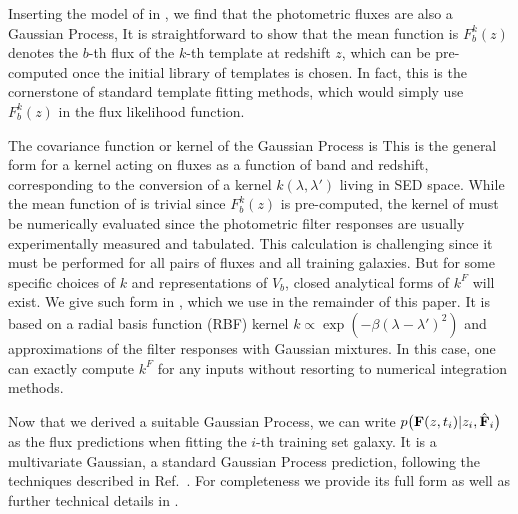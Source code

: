 \documentclass[aps,prd,showpacs,superscriptaddress,groupedaddress]{revtex4}  %
\begin{document}
Inserting the model of  in , we find that the photometric fluxes are also a Gaussian Process,
It is straightforward to show that the mean function is
 $F^k_b(z)$ denotes the $b$-th flux of the $k$-th template at redshift $z$, which can be pre-computed once the initial library of templates is chosen. 
In fact, this is the cornerstone of standard template fitting methods, which would simply use $F^k_b(z)$ in the flux likelihood function.

The covariance function or kernel of the Gaussian Process is
This is the general form for a kernel acting on fluxes as a function of band and redshift, corresponding to the conversion of a kernel $k(\lambda, \lambda')$ living in SED space. 
While the mean function of  is trivial since $F^k_b(z)$ is pre-computed, the kernel of  must be numerically evaluated since the photometric filter responses are usually experimentally measured and tabulated. 
This calculation is challenging since it must be performed for all pairs of fluxes and all training galaxies. 
But for some specific choices of $k$ and representations of $V_b$, closed analytical forms of $k^F$ will exist. 
We give such form in , which we use in the remainder of this paper. 
It is based on a radial basis function (RBF) kernel $k\propto \exp(-\beta(\lambda-\lambda')^2)$ and approximations of the filter responses with Gaussian mixtures.
In this case, one can exactly compute $k^F$ for any inputs without resorting to numerical integration methods.

Now that we derived a suitable Gaussian Process, we can write $p\bigl( \mat{F}(z,t_i) | z_i, \hat{\mat{F}}_i\bigr)$ as the flux predictions when fitting the $i$-th training set galaxy. 
It is a multivariate Gaussian, a standard Gaussian Process prediction, \eg following the techniques described in Ref.~\cite{Rasmussen:2005}. 
For completeness we provide its full form as well as further technical details in .
\end{document}
